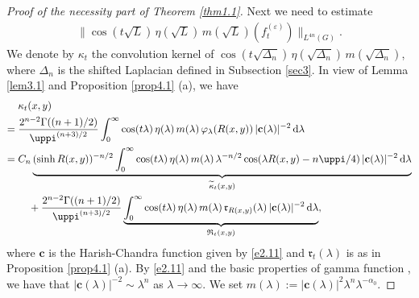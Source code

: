 \documentclass[a4paper,12pt]{amsart}
\numberwithin{equation}{section}
\theoremstyle{definition}
\theoremstyle{remark}
\numberwithin{theorem}{section}
\newcommand{\bc}{\mathbf{c}}
\renewcommand{\d}{\mathrm{d}}
\begin{document}
\begin{proof}[Proof of the necessity part of Theorem \ref{thm1.1}]
Next we need to estimate 
\begin{align}\label{e6.00001}
\|\cos (t\sqrt{L})\,\eta(\sqrt{L})\,m(\sqrt{L})(f^{(\varepsilon)}_t)\|_{L^{4n}(G)}.
\end{align}
We denote by $\kappa_t$ the convolution kernel of $\cos (t\sqrt{\Delta_n})\,\eta(\sqrt{\Delta_n})\,m(\sqrt{\Delta_n})$, where $\Delta_n$ is the shifted Laplacian defined in Subsection \ref{sec3}. In view of Lemma \ref{lem3.1} and Proposition \ref{prop4.1} (a), we have
\begin{align}\label{e6.0001}
{}&\kappa_t(x,y)\\
={}&{2^{n-2}\Gamma((n+1)/2)\over\uppi^{(n+3)/2}}\int_0^\infty\cos(t\lambda)\,\eta(\lambda)\, m(\lambda)\,\varphi_\lambda(R(x,y))\,|\bc(\lambda)|^{-2}\,\d\lambda \nonumber\\
={}&C_n\underbrace{(\sinh R(x,y))^{-n/2}\int_0^\infty\cos(t\lambda)\,\eta(\lambda)\, m(\lambda)\,\lambda^{-n/2} \cos(\lambda R(x,y)-n\uppi/4)\,|\bc(\lambda)|^{-2}\,\d\lambda}_{\widetilde{\kappa}_t(x,y)}\nonumber\\
{}&\quad+{2^{n-2}\Gamma((n+1)/2)\over\uppi^{(n+3)/2}}\underbrace{ \int_0^\infty\cos(t\lambda)\,\eta(\lambda)\, m(\lambda)\, \mathfrak{r}_{R(x,y)}(\lambda)\,|\bc(\lambda)|^{-2}\,\d\lambda}_{\mathfrak{R}_t(x,y)}, \nonumber 
\end{align}
where $\bc$ is the Harish-Chandra function given by \eqref{e2.11} and $\mathfrak{r}_t(\lambda)$ is as in Proposition \ref{prop4.1} (a). By \eqref{e2.11} and the basic properties of gamma function \cite[(2), (5) and (7) on p. 3]{Er}, we have that $|\bc(\lambda)|^{-2}\sim \lambda^n$ as $\lambda\to\infty$. We set $m(\lambda):=|\bc(\lambda)|^2\lambda^n\lambda^{-\alpha_0}$.


\end{proof}
\end{document}
